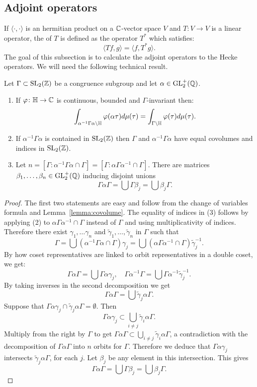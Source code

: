 \subsection{Adjoint operators}
If $\langle\cdot,\cdot\rangle$ is an hermitian product on a $\mathbb{C}$-vector space $V$ and $T\colon V\to V$ is a linear operator, the  of $T$ is defined as the operator $T^*$ which satisfies:
\[
\langle Tf,g\rangle = \langle f,T^*g\rangle.
\]
The goal of this subsection is to calculate the adjoint operators to the Hecke operators. We will need the following technical result.
\begin{lemma}
  Let $\Gamma\subset\operatorname{SL}_2(\mathbb{Z})$ be a congruence subgroup and let $\alpha\in \operatorname{GL}_2^+(\mathbb{Q})$.
  \begin{enumerate}
  \item If $\varphi\colon\mathbb{H}\to \mathbb{C}$ is continuous, bounded and $\Gamma$-invariant then:
\[
\int_{\alpha^{-1}\Gamma\alpha\backslash\mathbb{H}} \varphi(\alpha\tau)d\mu(\tau) = \int_{\Gamma\backslash\mathbb{H}} \varphi(\tau)d\mu(\tau).
\]
\item If $\alpha^{-1}\Gamma\alpha$ is contained in $\operatorname{SL}_2(\mathbb{Z})$ then $\Gamma$ and $\alpha^{-1}\Gamma\alpha$ have equal covolumes and indices in $\operatorname{SL}_2(\mathbb{Z})$.
\item Let $n=[\Gamma\colon\alpha^{-1}\Gamma\alpha\cap\Gamma] = [\Gamma\colon \alpha\Gamma\alpha^{-1}\cap\Gamma]$. There are matrices $\beta_1,\ldots,\beta_n\in\operatorname{GL}_2^+(\mathbb{Q})$ inducing disjoint unions
\[
\Gamma\alpha\Gamma = \bigcup \Gamma \beta_j = \bigcup \beta_j \Gamma.
\]
  \end{enumerate}
\end{lemma}
\begin{proof}
  The first two statements are easy and follow from the change of variables formula and Lemma~\ref{lemma:covolume}. The equality of indices in (3) follows by applying (2) to $\alpha\Gamma\alpha^{-1}\cap\Gamma$ instead of $\Gamma$ and using multiplicativity of indices. Therefore there exist $\gamma_1,\ldots\gamma_n$ and $\tilde\gamma_1,\ldots,\tilde\gamma_n$ in $\Gamma$ such that
\[
\Gamma = \bigcup (\alpha^{-1}\Gamma\alpha \cap \Gamma)\gamma_j = \bigcup (\alpha\Gamma\alpha^{-1}\cap \Gamma)\tilde\gamma_j^{-1}.
\]
By how coset representatives are linked to orbit representatives in a double coset, we get:
\[
\Gamma\alpha\Gamma = \bigcup \Gamma \alpha\gamma_j,\quad \Gamma\alpha^{-1}\Gamma=\bigcup \Gamma\alpha^{-1}\tilde\gamma_j^{-1}.
\]
By taking inverses in the second decomposition we get
\[
\Gamma\alpha\Gamma = \bigcup \tilde\gamma_j\alpha\Gamma.
\]
Suppose that $\Gamma\alpha\gamma_j\cap \tilde\gamma_j\alpha\Gamma = \emptyset$. Then
\[
\Gamma\alpha\gamma_j\subset\bigcup_{i\neq j} \tilde\gamma_i\alpha\Gamma.
\]
Multiply from the right by $\Gamma$ to get $\Gamma\alpha\Gamma\subset \bigcup_{i\neq j} \tilde\gamma_i\alpha\Gamma$,  a contradiction with the decomposition of $\Gamma\alpha\Gamma$ into $n$ orbits for $\Gamma$. Therefore we deduce that $\Gamma\alpha\gamma_j$ intersects $\tilde\gamma_j\alpha\Gamma$, for each $j$. Let $\beta_j$ be any element in this intersection. This gives
\[
\Gamma\alpha\Gamma=\bigcup\Gamma\beta_j = \bigcup\beta_j\Gamma.
\]
\end{proof}
